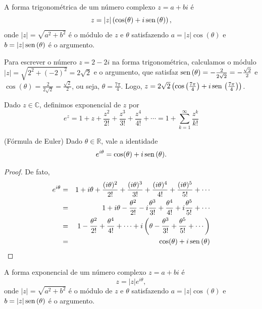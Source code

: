 \begin{defn}A forma trigonométrica de um número complexo $z=a+bi$ é 
\begin{equation}
z=|z|\left(\cos(\theta)+i\operatorname{sen}\,(\theta)\right),
\end{equation}
onde $|z|=\sqrt{a^2+b^2}$ é o módulo de $z$ e $\theta$ satisfazendo $a=|z|\cos(\theta)$ e $b=|z|\operatorname{sen}\,(\theta)$ é o argumento.
\end{defn}
\begin{ex}Para escrever o número $z=2-2i$ na forma trigonométrica, calculamos o módulo $|z|=\sqrt{2^2+(-2)^2}=2\sqrt{2}$ e o argumento, que satisfaz $\operatorname{sen}\,(\theta)=-\frac{2}{2\sqrt{2}}=-\frac{\sqrt{2}}{2}$ e $\cos(\theta)=\frac{2}{2\sqrt{2}}=\frac{\sqrt{2}}{2}$, ou seja, $\theta=\frac{7\pi}{4}$. Logo, $z=2\sqrt{2}\left(\cos\left(\frac{7\pi}{4}\right)+i\operatorname{sen}\,\left(\frac{7\pi}{4}\right)\right)$. 
\end{ex}
\begin{defn}Dado $z\in\mathbb{C}$, definimos exponencial de $z$ por
\begin{equation}
e^z=1+z+\frac{z^2}{2!}+\frac{z^3}{3!}+\frac{z^4}{4!}+\cdots=1+\sum_{k=1}^\infty \frac{z^k}{k!}
\end{equation}
\end{defn}
\begin{prop}(Fórmula de Euler) Dado $\theta\in\mathbb{R}$, vale a identidade
\begin{equation}
e^{i\theta}=\cos(\theta)+i\operatorname{sen}\,(\theta).
\end{equation}
\end{prop}
\begin{proof}
De fato,
\begin{eqnarray*}
e^{i\theta}&=&1+i\theta+\frac{(i \theta)^2}{2!}+\frac{(i\theta)^3}{3!}+\frac{(i\theta)^4}{4!}+\frac{(i\theta)^5}{5!}+\cdots\\
&=&1+i\theta-\frac{\theta^2}{2!}-i\frac{\theta^3}{3!}+\frac{\theta^4}{4!}+i\frac{\theta^5}{5!}+\cdots\\
&=&1-\frac{\theta^2}{2!}+\frac{\theta^4}{4!}+\cdots    +i\left(\theta-\frac{\theta^3}{3!}+\frac{\theta^5}{5!}+\cdots\right)\\
&=&\cos(\theta)    +i\operatorname{sen}\,(\theta)
\end{eqnarray*}
\end{proof}
\begin{defn}A forma exponencial de um número complexo $z=a+bi$ é 
\begin{equation}
z=|z|e^{i\theta},
\end{equation}
onde $|z|=\sqrt{a^2+b^2}$ é o módulo de $z$ e $\theta$ satisfazendo $a=|z|\cos(\theta)$ e $b=|z|\operatorname{sen}\,(\theta)$ é o argumento.
\end{defn}
